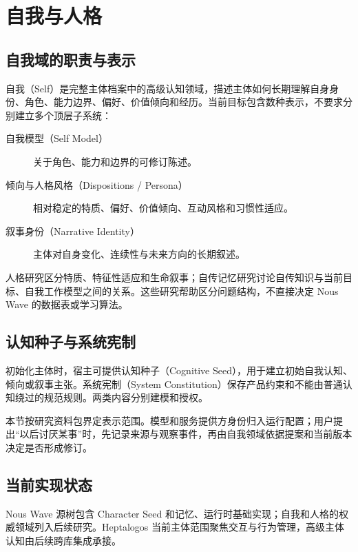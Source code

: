 \chapter{自我与人格}

\section{自我域的职责与表示}

自我（Self）是完整主体档案中的高级认知领域，描述主体如何长期理解自身身份、角色、能力边界、偏好、价值倾向和经历。当前目标包含数种表示，不要求分别建立多个顶层子系统：

\begin{description}
\item[自我模型（Self Model）] 关于角色、能力和边界的可修订陈述。
\item[倾向与人格风格（Dispositions / Persona）] 相对稳定的特质、偏好、价值倾向、互动风格和习惯性适应。
\item[叙事身份（Narrative Identity）] 主体对自身变化、连续性与未来方向的长期叙述。
\end{description}

人格研究区分特质、特征性适应和生命叙事；自传记忆研究讨论自传知识与当前目标、自我工作模型之间的关系。这些研究帮助区分问题结构，不直接决定 Nous Wave 的数据表或学习算法。\cite{mcadams2006,mcadamsmclean2013,conwaypleydellpearce2000}

\section{认知种子与系统宪制}

初始化主体时，宿主可提供认知种子（Cognitive Seed），用于建立初始自我认知、倾向或叙事主张。系统宪制（System Constitution）保存产品约束和不能由普通认知绕过的规范规则。两类内容分别建模和授权。\cite{nous-research-package}


本节按研究资料包界定表示范围。模型和服务提供方身份归入运行配置；用户提出“以后讨厌某事”时，先记录来源与观察事件，再由自我领域依据提案和当前版本决定是否形成修订。

\section{当前实现状态}

Nous Wave 源树包含 Character Seed 和记忆、运行时基础实现；自我和人格的权威领域列入后续研究。Heptalogos 当前主体范围聚焦交互与行为管理，高级主体认知由后续跨库集成承接。
